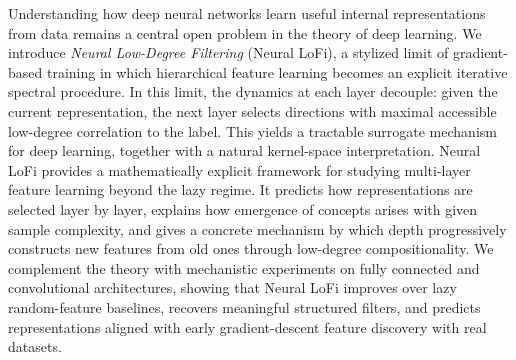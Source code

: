 Understanding how deep neural networks learn useful internal representations from data remains a central open problem in the theory of deep learning. We introduce \emph{Neural Low-Degree Filtering} (Neural LoFi), a stylized limit of gradient-based training in which hierarchical feature learning becomes an explicit iterative spectral procedure. In this limit, the dynamics at each layer decouple: given the current representation, the next layer selects directions with maximal accessible low-degree correlation to the label. This yields a tractable surrogate mechanism for deep learning, together with a natural kernel-space interpretation. Neural LoFi provides a mathematically explicit framework for studying multi-layer feature learning beyond the lazy regime. It predicts how representations are selected layer by layer, explains how emergence of concepts arises with given sample complexity,
and gives a concrete mechanism by which depth progressively constructs new features from old ones through low-degree compositionality. We complement the theory with mechanistic experiments on fully connected and convolutional architectures, showing that Neural LoFi improves over lazy random-feature baselines, recovers meaningful structured filters, and predicts representations aligned with early gradient-descent feature discovery with real datasets.
